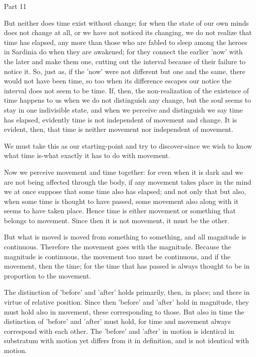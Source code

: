 Part 11

But neither does time exist without change; for when the state of
our own minds does not change at all, or we have not noticed its changing,
we do not realize that time has elapsed, any more than those who are
fabled to sleep among the heroes in Sardinia do when they are awakened;
for they connect the earlier 'now' with the later and make them one,
cutting out the interval because of their failure to notice it. So,
just as, if the 'now' were not different but one and the same, there
would not have been time, so too when its difference escapes our notice
the interval does not seem to be time. If, then, the non-realization
of the existence of time happens to us when we do not distinguish
any change, but the soul seems to stay in one indivisible state, and
when we perceive and distinguish we say time has elapsed, evidently
time is not independent of movement and change. It is evident, then,
that time is neither movement nor independent of movement.

We must take this as our starting-point and try to discover-since
we wish to know what time is-what exactly it has to do with movement.

Now we perceive movement and time together: for even when it is dark
and we are not being affected through the body, if any movement takes
place in the mind we at once suppose that some time also has elapsed;
and not only that but also, when some time is thought to have passed,
some movement also along with it seems to have taken place. Hence
time is either movement or something that belongs to movement. Since
then it is not movement, it must be the other. 

But what is moved is moved from something to something, and all magnitude
is continuous. Therefore the movement goes with the magnitude. Because
the magnitude is continuous, the movement too must be continuous,
and if the movement, then the time; for the time that has passed is
always thought to be in proportion to the movement. 

The distinction of 'before' and 'after' holds primarily, then, in
place; and there in virtue of relative position. Since then 'before'
and 'after' hold in magnitude, they must hold also in movement, these
corresponding to those. But also in time the distinction of 'before'
and 'after' must hold, for time and movement always correspond with
each other. The 'before' and 'after' in motion is identical in substratum
with motion yet differs from it in definition, and is not identical
with motion. 

